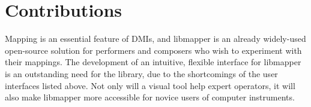 \documentclass[11pt]{article}
\begin{document}
 \begin{comment} 

Expanded Notes:

cite vijay's thesis, make it central, limitations

  ONE place, integreble

  main goal is to integrate, specific TIMELINE (order)
  \newline
  
   \begin{tabular}{lll}

   Schedule: && \\
    Number & Step & Time\\
   1.& Integrate vizmapper functionality into webmapper & 1 month?\\
    2. & Include all MapGUI into webmapper & ?\\
    3. & New features (bundling, new mappings) & 3 months \\
    4. & Feedback & 1 month? \\
   
   \newline
   
  \end{tabular}
  
  Let's look at Gabriel's for this!
  
  "provide to longterm users and get feedback"
"user centered design" (find reference)
\end{comment}
  
\section*{Contributions}

Mapping is an essential feature of DMIs, and libmapper is an already widely-used open-source solution for performers and composers who wish to experiment with their mappings. The development of an intuitive, flexible interface for libmapper is an outstanding need for the library, due to the shortcomings of the user interfaces listed above. Not only will a visual tool help expert operators, it will also make libmapper more accessible for novice users of computer instruments. 
\end{document}

